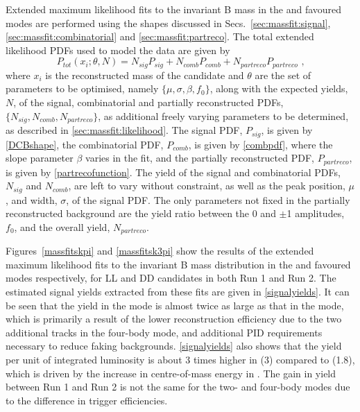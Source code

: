Extended maximum likelihood fits to the invariant B mass in the \kpi and \kpipipi favoured modes are performed using the shapes discussed in Secs.~\ref{sec:massfit:signal}, \ref{sec:massfit:combinatorial} and \ref{sec:massfit:partreco}. The total extended likelihood PDFs used to model the data are given by
\begin{equation}
P_{tot}(x_i;\theta, N) = N_{sig}P_{sig} + N_{comb}P_{comb} + N_{partreco}P_{partreco} \text{ ,}
\label{totalpdf}
\end{equation}
where $x_i$ is the reconstructed \Bm mass of the candidate and $\theta$ are the set of parameters to be optimised, namely $\{\mu, \sigma, \beta, f_0\}$, along with the expected yields, $N$, of the signal, combinatorial and partially reconstructed PDFs, $\{N_{sig}, N_{comb}, N_{partreco}\}$, as additional freely varying parameters to be determined, as described in \sect\ref{sec:massfit:likelihood}. The signal PDF, $P_{sig}$, is given by \eqn\ref{DCBshape}, the combinatorial PDF, $P_{comb}$, is given by \eqn\ref{combpdf}, where the slope parameter $\beta$ varies in the fit, and the partially reconstructed PDF, $P_{partreco}$, is given by \eqn\ref{partrecofunction}. The yield of the signal and combinatorial PDFs, $N_{sig}$ and $N_{comb}$, are left to vary without constraint, as well as the peak position, $\mu$, and width, $\sigma$, of the signal PDF. The only parameters not fixed in the partially reconstructed background are the yield ratio between the 0 and $\pm$1 amplitudes, $f_0$, and the overall yield, $N_{partreco}$.

Figures~\ref{massfitskpi} and \ref{massfitsk3pi} show the results of the extended maximum likelihood fits to the invariant B mass distribution in the \kpi and \kpipipi favoured modes respectively, for LL and DD candidates in both Run 1 and Run 2. The estimated signal yields extracted from these fits are given in \tab\ref{signalyields}. It can be seen that the yield in the \kpi mode is almost twice as large as that in the \kpipipi mode, which is primarily a result of the lower reconstruction efficiency due to the two additional tracks in the four-body mode, and additional PID requirements necessary to reduce faking backgrounds. \Tab\ref{signalyields} also shows that the yield per unit of integrated luminosity is about 3 times higher in \runone (3\invfb) compared to \runtwo (1.8\invfb), which is driven by the increase in centre-of-mass energy in \runtwo. The gain in yield between Run 1 and Run 2 is not the same for the two- and four-body modes due to the difference in trigger efficiencies.

